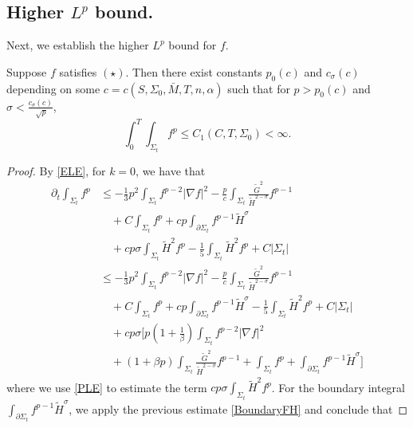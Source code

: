 \subsection{Higher \texorpdfstring{\(L^p\)}{Lp} bound.}
Next, we establish the higher $L^p$ bound for $f$.

\begin{lemma} \label{hlp}
    Suppose $f$ satisfies $(\star)$. Then there exist constants $p_0(c)$ and $c_\sigma (c)$ depending on some $c=c(S, \Sigma_0,\bar{M},T,n,\alpha )$ such that for $p>p_0(c)$ and $\sigma < \frac{c_{\sigma }(c)}{\sqrt[]{p}}$,
    \[\int_{0}^{T}\int_{\Sigma_t} f^p \leq C_1(C,T,\Sigma_0)<\infty .\]  
\end{lemma}

\begin{proof}
    By \autoref{ELE}, for $k=0$, we have that
    \begin{equation*}
    \begin{split}
        \partial_t \int_{\Sigma_t} f^p
        &\leq   -\frac{1}{3}p^2 \int_{\Sigma_t} f^{p-2}\left| \nabla f \right| ^2   -\frac{p}{c} \int_{\Sigma_t} \frac{\tilde{G}^2}{\tilde{H}^{2-\sigma }}f^{p-1}\\
        &\quad +C \int_{\Sigma_t} f^p+cp\int_{\partial \Sigma_t} f^{p-1}\tilde{H}^{\sigma }\\
        &\quad +cp \sigma \int_{\Sigma_t}^{}\tilde{H}^2f^p-\frac{1}{5}\int_{\Sigma_t} \tilde{H}^2f^{p}+C \left| \Sigma_t \right| \\
        &\leq   -\frac{1}{3}p^2 \int_{\Sigma_t} f^{p-2}\left| \nabla f \right| ^2   -\frac{p}{c} \int_{\Sigma_t} \frac{\tilde{G}^2}{\tilde{H}^{2-\sigma }}f^{p-1}\\
        &\quad +C \int_{\Sigma_t} f^p+cp\int_{\partial \Sigma_t} f^{p-1}\tilde{H}^{\sigma } -\frac{1}{5}\int_{\Sigma_t} \tilde{H}^2f^{p}+C \left| \Sigma_t \right| \\
        &\quad +cp \sigma [ p \left( 1+\frac{1}{\beta } \right) \int_{\Sigma_t} f^{p-2}\left| \nabla f \right| ^2   \\
        &\quad +\left( 1+\beta p \right) \int_{\Sigma_t} \frac{\tilde{G}^2}{\tilde{H}^{2-\sigma }}f^{p-1} +\int_{\Sigma_t} f^p+\int_{\partial \Sigma_t} f^{p-1}\tilde{H}^{\sigma } ] 
    \end{split}
    \end{equation*} 
    where we use \autoref{PLE} to estimate the term $cp \sigma \int_{\Sigma_t}^{}\tilde{H}^2f^p$.
    For the boundary integral $\int_{\partial \Sigma_t} f^{p-1}\tilde{H}^{\sigma }$, we apply the previous estimate \autoref{BoundaryFH} and conclude that 

\end{proof}

